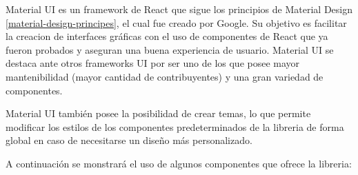         Material UI es un framework de React que sigue los principios de Material Design \ref*{material-design-principes}, el cual fue creado por Google. Su objetivo es facilitar la creacion de interfaces gráficas con el uso de componentes de React que ya fueron probados y aseguran una buena experiencia de usuario. Material UI se destaca ante otros frameworks UI por ser uno de los que posee mayor mantenibilidad (mayor cantidad de contribuyentes) y una gran variedad de componentes.

        Material UI también posee la posibilidad de crear temas, lo que permite modificar los estilos de los componentes predeterminados de la libreria de forma global en caso de necesitarse un diseño más personalizado.

        A continuación se monstrará el uso de algunos componentes que ofrece la libreria:

